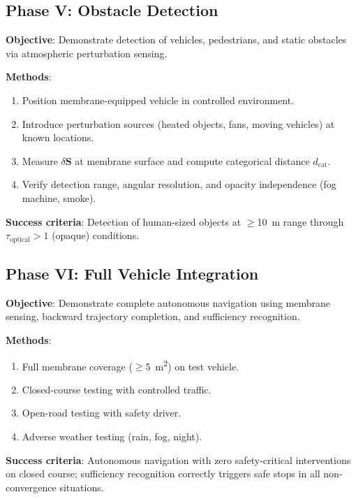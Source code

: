\documentclass[twocolumn,10pt]{article}
\theoremstyle{definition}
\theoremstyle{remark}
\newcommand{\dcat}{d_{\mathrm{cat}}}
\begin{document}
\subsection{Phase V: Obstacle Detection}

\textbf{Objective}: Demonstrate detection of vehicles, pedestrians, and static obstacles via atmospheric perturbation sensing.

\textbf{Methods}:
\begin{enumerate}[label=\arabic*.]
  \item Position membrane-equipped vehicle in controlled environment.
  \item Introduce perturbation sources (heated objects, fans, moving vehicles) at known locations.
  \item Measure $\delta\mathbf{S}$ at membrane surface and compute categorical distance $\dcat$.
  \item Verify detection range, angular resolution, and opacity independence (fog machine, smoke).
\end{enumerate}

\textbf{Success criteria}: Detection of human-sized objects at $\geq$\SI{10}{m} range through $\tau_{\mathrm{optical}} > 1$ (opaque) conditions.

\subsection{Phase VI: Full Vehicle Integration}

\textbf{Objective}: Demonstrate complete autonomous navigation using membrane sensing, backward trajectory completion, and sufficiency recognition.

\textbf{Methods}:
\begin{enumerate}[label=\arabic*.]
  \item Full membrane coverage ($\geq$\SI{5}{m^2}) on test vehicle.
  \item Closed-course testing with controlled traffic.
  \item Open-road testing with safety driver.
  \item Adverse weather testing (rain, fog, night).
\end{enumerate}

\textbf{Success criteria}: Autonomous navigation with zero safety-critical interventions on closed course; sufficiency recognition correctly triggers safe stops in all non-convergence situations.
\end{document}
